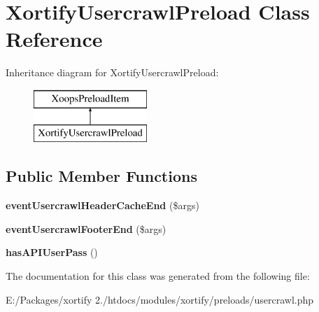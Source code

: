 \hypertarget{class_xortify_usercrawl_preload}{\section{Xortify\-Usercrawl\-Preload Class Reference}
\label{class_xortify_usercrawl_preload}
}
Inheritance diagram for Xortify\-Usercrawl\-Preload\-:\begin{figure}[H]
\begin{center}
\leavevmode
\includegraphics[height=2.000000cm]{class_xortify_usercrawl_preload}
\end{center}
\end{figure}
\subsection*{Public Member Functions}
\begin{DoxyCompactItemize}
\item 
\hypertarget{class_xortify_usercrawl_preload_a6bc37611c1b57122d9e34d19453ee500}{{\bfseries event\-Usercrawl\-Header\-Cache\-End} (\$args)}\label{class_xortify_usercrawl_preload_a6bc37611c1b57122d9e34d19453ee500}

\item 
\hypertarget{class_xortify_usercrawl_preload_a3448fe99c6b9a8fedb7156033468d3f8}{{\bfseries event\-Usercrawl\-Footer\-End} (\$args)}\label{class_xortify_usercrawl_preload_a3448fe99c6b9a8fedb7156033468d3f8}

\item 
\hypertarget{class_xortify_usercrawl_preload_a3891f6ff17df02586d169c7d18f652df}{{\bfseries has\-A\-P\-I\-User\-Pass} ()}\label{class_xortify_usercrawl_preload_a3891f6ff17df02586d169c7d18f652df}

\end{DoxyCompactItemize}


The documentation for this class was generated from the following file\-:\begin{DoxyCompactItemize}
\item 
E\-:/\-Packages/xortify 2./htdocs/modules/xortify/preloads/usercrawl.\-php\end{DoxyCompactItemize}
